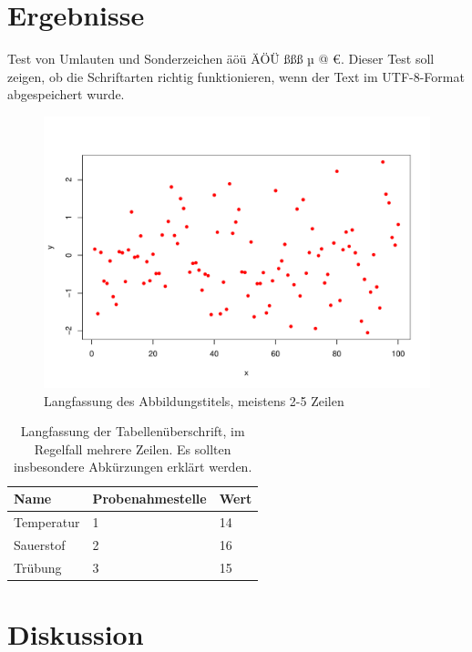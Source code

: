 \documentclass[english,ngerman,BCOR=6mm,cdgeometry=no,DIV=13]{tudscrreprt}
\begin{document}
\chapter{Ergebnisse}

Test von Umlauten und Sonderzeichen äöü ÄÖÜ ßßß µ @ €. Dieser Test soll zeigen,
ob die Schriftarten richtig funktionieren, wenn der Text im UTF-8-Format
abgespeichert wurde.

\begin{figure}
	\centering
	\includegraphics[width=\textwidth]{pdf-plot.pdf}
	\caption[Kurzfassung des Abbildungstitels]{Langfassung des Abbildungstitels,
	         meistens 2-5 Zeilen}\label{fig:fig_1}
\end{figure}

\begin{table}
	\centering
	\caption[Kurzfassung der Tabellenüberschrft]{Langfassung der Tabellenüberschrift,
	        im Regelfall mehrere Zeilen. Es sollten insbesondere Abkürzungen erklärt werden.}
	\label{tab:my_label}
	\begin{tabular}{lll}\hline
		Name & Probenahmestelle & Wert\\\hline
		Temperatur & 1  & 14  \\
		Sauerstof & 2  & 16 \\
		Trübung & 3 & 15 \\ \hline
	\end{tabular}
\end{table}

\chapter{Diskussion}
\end{document}
